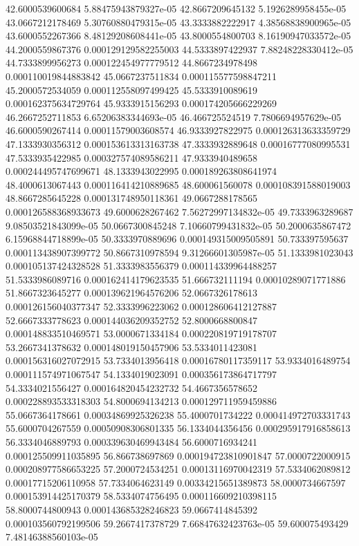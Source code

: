 {42.6000539600684 5.88475943879327e-05
42.8667209645132 5.1926289958455e-05
43.0667212178469 5.30760880479315e-05
43.3333882222917 4.38568838900965e-05
43.6000552267366 8.48129208608441e-05
43.8000554800703 8.16190947033572e-05
44.2000559867376 0.000129129582255003
44.5333897422937 7.88248228330412e-05
44.7333899956273 0.000122454977779512
44.8667234978498 0.000110019844883842
45.0667237511834 0.000115577598847211
45.2000572534059 0.000112558097499425
45.5333910089619 0.000162375634729764
45.9333915156293 0.000174205666229269
46.2667252711853 6.65206383344693e-05
46.466725524519 7.7806694957629e-05
46.6000590267414 0.00011579003608574
46.9333927822975 0.000126313633359729
47.1333930356312 0.000153613313163738
47.3333932889648 0.00016777080995531
47.5333935422985 0.000327574089586211
47.9333940489658 0.000244495747699671
48.1333943022995 0.000189263808641974
48.4000613067443 0.000116414210889685
48.600061560078 0.000108391588019003
48.8667285645228 0.000131748950118361
49.0667288178565 0.000126588368933673
49.6000628267462 7.56272997134832e-05
49.7333963289687 9.08503521843099e-05
50.0667300845248 7.10660799431832e-05
50.2000635867472 6.15968844718899e-05
50.3333970889696 0.000149315009505891
50.733397595637 0.000113438907399772
50.8667310978594 9.31266601305987e-05
51.1333981023043 0.000105137424328528
51.3333983556379 0.000114339964488257
51.5333986089716 0.000162414179623535
51.666732111194 0.00010289071771886
51.8667323645277 0.000139621964576206
52.0667326178613 0.000126156040377347
52.3333996223062 0.000128606412127887
52.6667333778623 0.000144036209352752
52.8000668800847 0.000148833510469571
53.0000671334184 0.000220819719178707
53.2667341378632 0.000148019150457906
53.5334011423081 0.000156316027072915
53.7334013956418 0.00016780117359117
53.9334016489754 0.000111574971067547
54.1334019023091 0.000356173864717797
54.3334021556427 0.000164820454232732
54.4667356578652 0.000228893533318303
54.8000694134213 0.000129711959459886
55.0667364178661 0.00034869925326238
55.4000701734222 0.000414972703331743
55.6000704267559 0.00050908306801335
56.1334044356456 0.000295917916858613
56.3334046889793 0.000339630469943484
56.6000716934241 0.000125509911035895
56.866738697869 0.000194723810901847
57.0000722000915 0.000208977586653225
57.2000724534251 0.00013116970042319
57.5334062089812 0.00017715206110958
57.7334064623149 0.00334215651389873
58.0000734667597 0.000153914425170379
58.5334074756495 0.000116609210398115
58.8000744800943 0.000143685328246823
59.0667414845392 0.000103560792199506
59.2667417378729 7.66847632423763e-05
59.600075493429 7.48146388560103e-05
}
